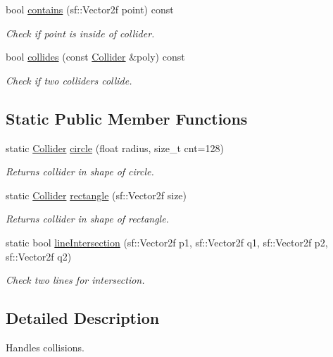 \begin{DoxyCompactItemize}
bool \hyperlink{classsfgf_1_1Collider_af193ced12d857c8cec6f604ae4d9c905}{contains} (sf\+::\+Vector2f point) const 
\begin{DoxyCompactList}\small\item\em Check if point is inside of collider. \end{DoxyCompactList}\item 
bool \hyperlink{classsfgf_1_1Collider_a51b98794c87237d2cbf4cf3fdbfd2c62}{collides} (const \hyperlink{classsfgf_1_1Collider}{Collider} \&poly) const 
\begin{DoxyCompactList}\small\item\em Check if two colliders collide. \end{DoxyCompactList}\end{DoxyCompactItemize}
\subsection*{Static Public Member Functions}
\begin{DoxyCompactItemize}
\item 
static \hyperlink{classsfgf_1_1Collider}{Collider} \hyperlink{classsfgf_1_1Collider_a22251044e824c236f250689c4023c992}{circle} (float radius, size\+\_\+t cnt=128)
\begin{DoxyCompactList}\small\item\em Returns collider in shape of circle. \end{DoxyCompactList}\item 
static \hyperlink{classsfgf_1_1Collider}{Collider} \hyperlink{classsfgf_1_1Collider_aaf00da4b750ec490048de061c98d8ad0}{rectangle} (sf\+::\+Vector2f size)
\begin{DoxyCompactList}\small\item\em Returns collider in shape of rectangle. \end{DoxyCompactList}\item 
static bool \hyperlink{classsfgf_1_1Collider_a2e1731b6dfd829261e763154e5a27904}{line\+Intersection} (sf\+::\+Vector2f p1, sf\+::\+Vector2f q1, sf\+::\+Vector2f p2, sf\+::\+Vector2f q2)
\begin{DoxyCompactList}\small\item\em Check two lines for intersection. \end{DoxyCompactList}\end{DoxyCompactItemize}


\subsection{Detailed Description}
Handles collisions. 

